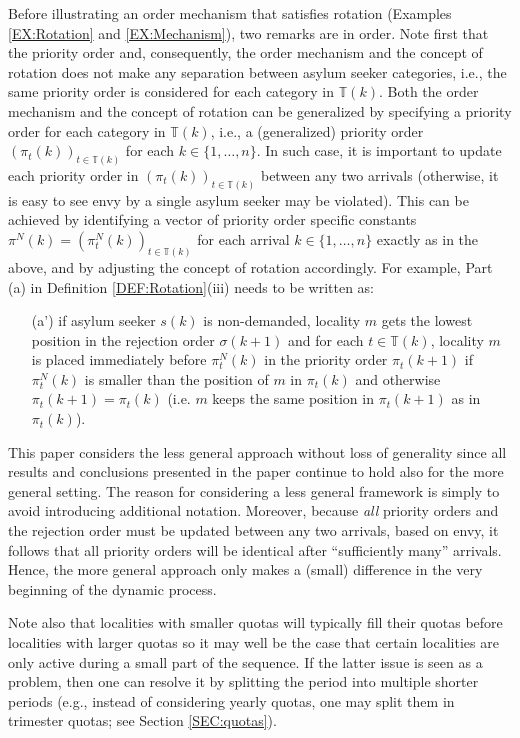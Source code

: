 \documentclass[12pt,fleqn]{article}
\begin{document}
\noindent Before illustrating an order mechanism that satisfies rotation (Examples \ref{EX:Rotation} and \ref{EX:Mechanism}), two remarks are in order. Note first that the priority order and, consequently, the order mechanism and the concept of rotation does not make any separation between asylum seeker categories, i.e., the same priority order is considered for each category in $\mathbb{T}(k)$. Both the order mechanism and the concept of rotation can be generalized by specifying a priority order for each category in $\mathbb{T}(k)$, i.e., a (generalized) priority order $(\pi_t(k))_{t\in \mathbb{T}(k)}$ for each $k\in\{1,\ldots,n\}$. In such case, it is important to update each priority order in $(\pi_t(k))_{t\in \mathbb{T}(k)}$ between any two arrivals (otherwise, it is easy to see envy by a single asylum seeker may be violated). This can be achieved by identifying a vector of priority order specific constants $\pi^N(k)=(\pi_t^N(k))_{t\in \mathbb{T}(k)}$ for each arrival $k\in\{1,\ldots,n\}$ exactly as in the above, and by adjusting the concept of rotation accordingly. For example, Part (a) in Definition \ref{DEF:Rotation}(iii) needs to be written as:
\begin{enumerate}
\item[(a')]
if asylum seeker $s(k)$ is non-demanded, locality $m$ gets the lowest position in the rejection order $\sigma(k+1)$ and
for each $t\in \mathbb{T}(k)$, locality $m$ is placed immediately before $\pi_t^{N}(k)$ in the priority order $\pi_t(k+1)$ if $\pi_t^N(k)$ is smaller than the position of $m$ in $\pi_t(k)$ and otherwise $\pi_t(k+1)=\pi_t(k)$ (i.e. $m$ keeps the same position in $\pi_t(k+1)$ as in $\pi_t(k)$).
\end{enumerate}
\noindent This paper considers the less general approach without loss of generality since all results and conclusions presented in the paper continue to hold also for the more general setting. The reason for considering a less general framework is simply to avoid introducing additional notation. Moreover, because \emph{all} priority orders and the rejection order must be updated between any two arrivals, based on envy, it follows that all priority orders will be identical after ``sufficiently many'' arrivals. Hence, the more general approach only makes a (small) difference in the very beginning of the dynamic process.

Note also that localities with smaller quotas will typically fill their quotas before localities with larger quotas so it may well be the case that certain localities are only active during a small part of the sequence. If the latter issue is seen as a problem, then one can resolve it by splitting the period into multiple shorter periods (e.g., instead of considering yearly quotas, one may split them in trimester quotas; see Section \ref{SEC:quotas}).
\end{document}
